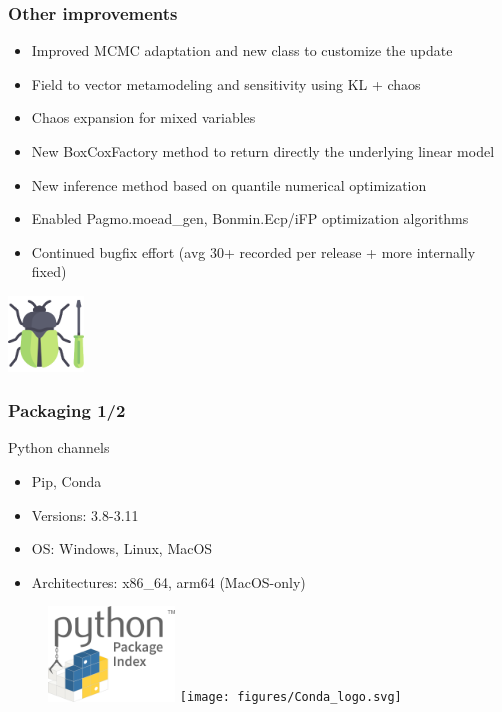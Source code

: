 \documentclass[aspectratio=169]{beamer}
\begin{document}
\begin{frame}
\frametitle{Other improvements}
\begin{itemize}
\item Improved MCMC adaptation and new class to customize the update
\item Field to vector metamodeling and sensitivity using KL + chaos
\item Chaos expansion for mixed variables
\item New BoxCoxFactory method to return directly the underlying linear model
\item New inference method based on quantile numerical optimization
\item Enabled Pagmo.moead\_gen, Bonmin.Ecp/iFP optimization algorithms
\item Continued bugfix effort (avg 30+ recorded per release + more internally fixed)
\end{itemize}

\vspace{6pt}

\begin{center}
\includegraphics[width=0.15\textwidth]{figures/bugfix}
\end{center}

\end{frame}


\begin{frame}
\frametitle{Packaging 1/2}
\begin{block}{Python channels}
\begin{itemize}
\item Pip, Conda
\item Versions: 3.8-3.11
\item OS: Windows, Linux, MacOS
\item Architectures: x86\_64, arm64 (MacOS-only)
\end{itemize}
\end{block}

\begin{figure}
   \includegraphics[width=0.3\textwidth]{figures/PyPI_logo}
   \texttt{[image: figures/Conda\_logo.svg]}
\end{figure}

\end{frame}
\end{document}
